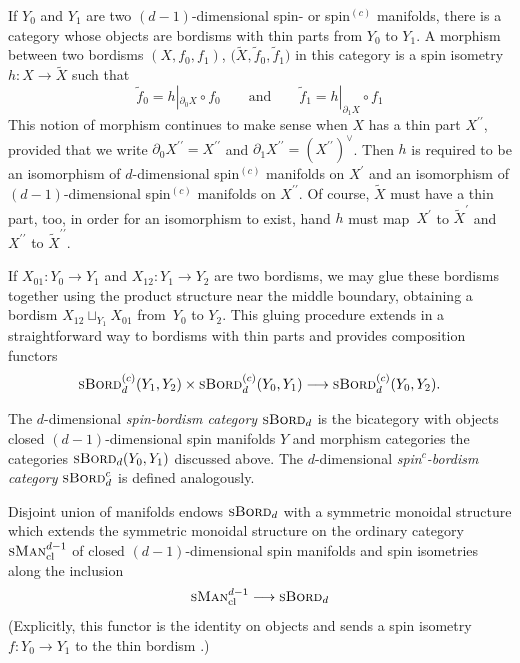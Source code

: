 \documentclass[10pt,a4paper]{amsart}
\numberwithin{equation}{section}
\newcommand{\id}{\mathrm{id}}
\newcommand{\sBord}{\textsc{sBord}}
\begin{document}
If $Y_0$ and $Y_1$ are two $(d-1)$-dimensional spin- or spin$^{(c)}$ manifolds, there is a category \smash{$\sBord^{{(c)}}_d(Y_0, Y_1)$} whose objects are bordisms with thin parts from $Y_0$ to $Y_1$.
A morphism between two bordisms $(X, f_0, f_1)$, $\big(\tilde{X}, \tilde{f}_0, \tilde{f}_1\big)$ in this category is a spin isometry $h\colon X \to \tilde{X}$ such that
\begin{equation*}
 \tilde{f}_0 = h|_{\partial_0 X} \circ f_0 \qquad \text{and} \qquad \tilde{f}_1 = h|_{\partial_1 X} \circ f_1
\end{equation*}
This notion of morphism continues to make sense when $X$ has a thin part $X^{\prime\prime}$, provided that we write $\partial_0 X^{\prime\prime} = X^{\prime\prime}$ and $\partial_1 X^{\prime\prime} = (X^{\prime\prime})^\vee$.
Then $h$ is required to be an isomorphism of $d$-dimensional spin$^{(c)}$ manifolds on $X^\prime$ and an isomorphism of $(d-1)$-dimensional spin$^{(c)}$ manifolds on $X^{\prime\prime}$.
Of course, $\tilde{X}$ must have a thin part, too, in order for an isomorphism to exist, hand $h$ must map~$X^\prime$ to $\tilde{X}^\prime$ and $X^{\prime\prime}$ to $\tilde{X}^{\prime\prime}$.

If $X_{01} \colon Y_0 \to Y_1$ and $X_{12} \colon Y_1 \to Y_2$ are two bordisms, we may glue these bordisms together using the product structure near the middle boundary, obtaining a bordism $X_{12} \sqcup_{Y_1} X_{01}$ from~$Y_0$ to $Y_2$.
This gluing procedure extends in a straightforward way to bordisms with thin parts and provides composition functors
\begin{equation*}
\sBord^{{(c)}}_d(Y_1, Y_2) \times \sBord^{{(c)}}_d(Y_0, Y_1) \longrightarrow \sBord^{{(c)}}_d(Y_0, Y_2).
\end{equation*}




\begin{Definition}
The $d$-dimensional \emph{spin-bordism category} $\sBord_d$ is the bicategory with objects closed $(d-1)$-dimensional spin manifolds $Y$ and morphism categories the categories $\sBord_d(Y_0, Y_1)$ discussed above.
The $d$-dimensional \emph{spin$^c$-bordism category} $\sBord^c_d$ is defined analogously.
\end{Definition}

Disjoint union of manifolds endows $\sBord_d$ with a symmetric monoidal structure which extends the symmetric monoidal structure on the ordinary category $\textsc{sMan}^{d-1}_{\mathrm{cl}}$ of closed $(d-1)$-dimensional spin manifolds and spin isometries along the inclusion
\begin{equation}
\label{Spinclusion}
 \textsc{sMan}^{d-1}_{\mathrm{cl}} \longrightarrow \sBord_d
\end{equation}
(Explicitly, this functor is the identity on objects and sends a spin isometry $f\colon Y_0 \to Y_1$ to the thin bordism \smash{$Y_1 \stackrel{\id}{\to} Y_1 \stackrel{f}{\leftarrow} Y_0$}.)
\end{document}
